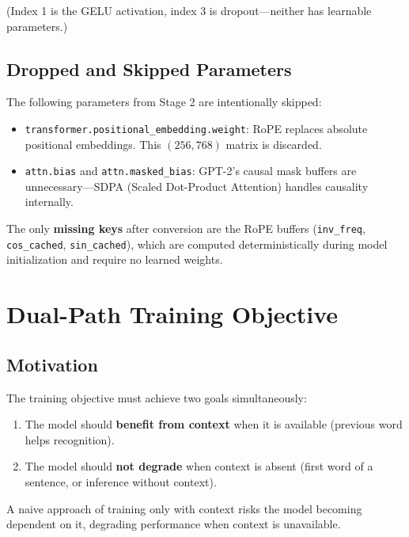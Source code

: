 \documentclass[11pt, a4paper]{article}
\begin{document}
(Index 1 is the GELU activation, index 3 is dropout---neither has learnable parameters.)

\subsection{Dropped and Skipped Parameters}

The following parameters from Stage 2 are intentionally skipped:
\begin{itemize}
    \item \texttt{transformer.positional\_embedding.weight}: RoPE replaces absolute positional embeddings. This $(256, 768)$ matrix is discarded.
    \item \texttt{attn.bias} and \texttt{attn.masked\_bias}: GPT-2's causal mask buffers are unnecessary---SDPA (Scaled Dot-Product Attention) handles causality internally.
\end{itemize}

The only \textbf{missing keys} after conversion are the RoPE buffers (\texttt{inv\_freq}, \texttt{cos\_cached}, \texttt{sin\_cached}), which are computed deterministically during model initialization and require no learned weights.

\section{Dual-Path Training Objective}

\subsection{Motivation}

The training objective must achieve two goals simultaneously:
\begin{enumerate}
    \item The model should \textbf{benefit from context} when it is available (previous word helps recognition).
    \item The model should \textbf{not degrade} when context is absent (first word of a sentence, or inference without context).
\end{enumerate}

A naive approach of training only with context risks the model becoming dependent on it, degrading performance when context is unavailable.
\end{document}
